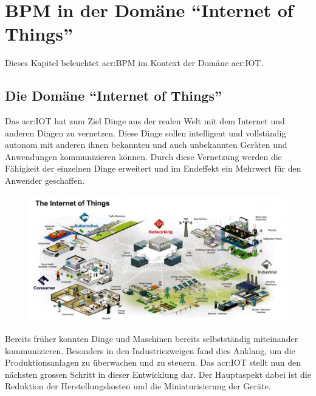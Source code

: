 
\chapter{BPM in der Domäne "`Internet of Things"'}
Dieses Kapitel beleuchtet \gls{acr:BPM} im Kontext der Domäne \gls{acr:IOT}.

\section{Die Domäne "`Internet of Things"'}
Das \gls{acr:IOT} hat zum Ziel Dinge aus der realen Welt mit dem Internet und anderen Dingen zu vernetzen. Diese Dinge sollen intelligent und vollständig autonom mit anderen ihnen bekannten und auch unbekannten Geräten und Anwendungen kommunizieren können. Durch diese Vernetzung werden die Fähigkeit der einzelnen Dinge erweitert und im Endeffekt ein Mehrwert für den Anwender geschaffen.

\begin{figure}[H]
 \centering
  \includegraphics[width=16cm]{./images/freescale_internet_of_things_overview_1}
\end{figure}

Bereits früher konnten Dinge und Maschinen bereits selbstständig miteinander kommunizieren. Besonders in den Industriezweigen fand dies Anklang, um die Produktionsanlagen zu überwachen und zu steuern. Das \gls{acr:IOT} stellt nun den nächsten grossen Schritt in dieser Entwicklung dar. Der Hauptaspekt dabei ist die Reduktion der Herstellungskosten und die Miniaturisierung der Geräte.

